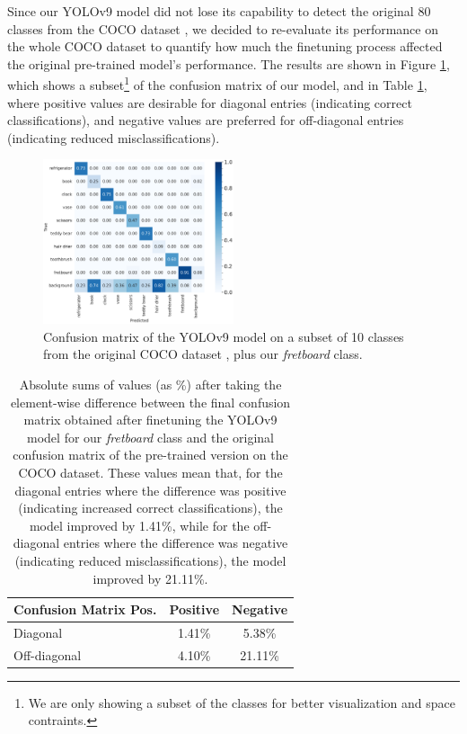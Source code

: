 \documentclass[10pt,twocolumn,letterpaper]{article}
\begin{document}
Since our YOLOv9 model did not lose its capability to detect the original 80 classes from the COCO dataset \cite{lin2015microsoftcococommonobjects}, we decided to re-evaluate its performance on the whole COCO dataset to quantify how much the finetuning process affected the original pre-trained model's performance. The results are shown in Figure \ref{fig:yolo-diff-confusion-matrix}, which shows a subset\footnote{We are only showing a subset of the classes for better visualization and space contraints.} of the confusion matrix of our model, and in Table \ref{tab:confusion-matrix-results}, where positive values are desirable for diagonal entries (indicating correct classifications), and negative values are preferred for off-diagonal entries (indicating reduced misclassifications).

\begin{figure}[h]
    \centering
    \includegraphics[width=0.5\textwidth]{images/final/yolo_confusion_matrix_subset.pdf}
    \caption{Confusion matrix of the YOLOv9 model on a subset of 10 classes from the original COCO dataset \cite{lin2015microsoftcococommonobjects}, plus our \emph{fretboard} class.}
    \label{fig:yolo-diff-confusion-matrix}
\end{figure}

\begin{table}[h]
    \centering
    \begin{tabular}{lcc}
        \toprule
        \textbf{Confusion Matrix Pos.} & \textbf{Positive} & \textbf{Negative} \\
        \midrule
        Diagonal                       & 1.41\%            & 5.38\%            \\
        \midrule
        Off-diagonal                   & 4.10\%            & 21.11\%           \\
        \bottomrule
    \end{tabular}
    \caption{Absolute sums of values (as \%) after taking the element-wise difference between the final confusion matrix obtained after finetuning the YOLOv9 model for our \emph{fretboard} class and the original confusion matrix of the pre-trained version on the COCO dataset. These values mean that, for the diagonal entries where the difference was positive (indicating increased correct classifications), the model improved by 1.41\%, while for the off-diagonal entries where the difference was negative (indicating reduced misclassifications), the model improved by 21.11\%.}
    \label{tab:confusion-matrix-results}
\end{table}
\end{document}
